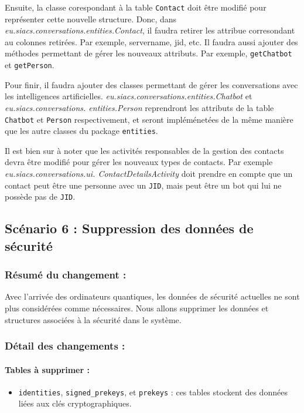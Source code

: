 \documentclass[a4paper,11pt]{article}
\begin{document}
Ensuite, la classe corespondant à la table \texttt{Contact} doit être modifié pour représenter cette nouvelle structure. Donc, dans \textit{eu.siacs.conversations.entities.Contact}, il faudra retirer les attribue corresondant au colonnes retirées. Par exemple, servername, jid, etc. Il faudra aussi ajouter des méthodes permettant de gérer les nouveaux attributs. Par exemple, \texttt{getChatbot} et \texttt{getPerson}.

Pour finir, il faudra ajouter des classes permettant de gérer les conversations avec les intelligences artificielles. \textit{eu.siacs.conversations.entities.Chatbot} et \textit{eu.siacs.conversations. entities.Person} reprendront les attributs de la table \texttt{Chatbot} et \texttt{Person} respectivement, et seront impléménetées de la même manière que les autre classes du package \texttt{entities}.

Il est bien sur à noter que les activités responsables de la gestion des contacts devra être modifié pour gérer les nouveaux types de contacts. Par exemple \textit{eu.siacs.conversations.ui.
ContactDetailsActivity} doit prendre en compte que un contact peut être une personne avec un \texttt{JID}, mais peut être un bot qui lui ne possède pas de \texttt{JID}. 



\subsection*{Scénario 6 : Suppression des données de sécurité}

\subsubsection*{Résumé du changement :}
Avec l'arrivée des ordinateurs quantiques, les données de sécurité actuelles ne sont plus considérées comme nécessaires. Nous allons supprimer les données et structures associées à la sécurité dans le système.

\subsubsection*{Détail des changements :}

\paragraph{Tables à supprimer :}
\begin{itemize}
    \item \texttt{identities}, \texttt{signed\_prekeys}, et \texttt{prekeys} : ces tables stockent des données liées aux clés cryptographiques.
\end{itemize}
\end{document}

